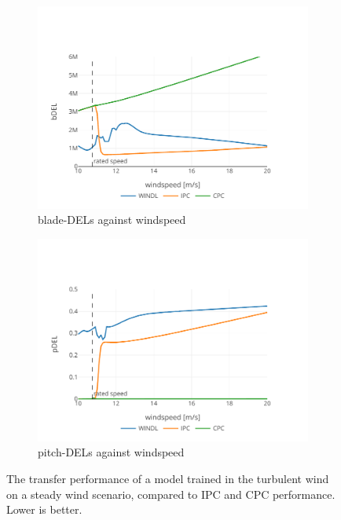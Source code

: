 \begin{figure}
  \centering
  \begin{subfigure}[b]{0.48\textwidth}
      \centering
      \includegraphics[width=\textwidth]{images/transfer_steady_bdel.pdf}
      \caption{blade-DELs against windspeed}
      \label{fig:transfer-steady-bdel}
  \end{subfigure}
  \begin{subfigure}[b]{0.48\textwidth}
      \centering
      \includegraphics[width=\textwidth]{images/transfer_steady_pdel.pdf}
      \caption{pitch-DELs against windspeed}
      \label{fig:transfer-steady-pdel}
  \end{subfigure}
  \caption{The transfer performance of a model trained in the turbulent wind on a steady wind scenario, compared to IPC and CPC performance. Lower is better.}
  \label{fig:transfer-steady}
\end{figure}


